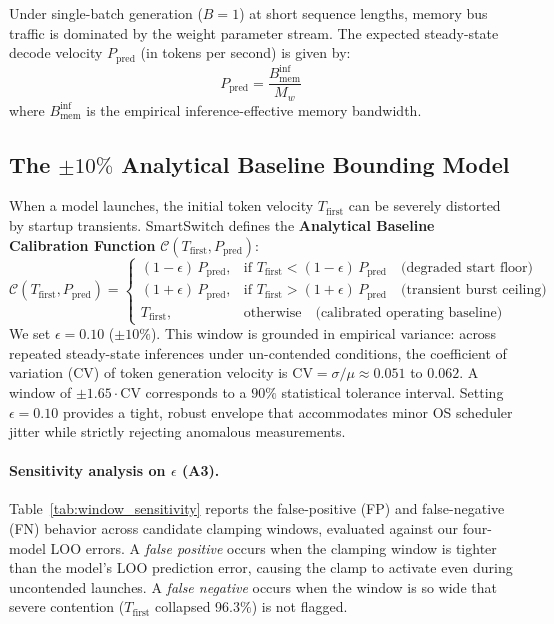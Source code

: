 \documentclass[11pt,a4paper]{article}
\newcommand{\Binf}{B_{\mathrm{mem}}^{\mathrm{inf}}}
\newcommand{\Tfirst}{T_{\mathrm{first}}}
\newcommand{\Ppred}{P_{\mathrm{pred}}}
\newcommand{\Mw}{M_w}
\newcommand{\Cfun}{\mathcal{C}}
\begin{document}
Under single-batch generation ($B=1$) at short sequence lengths, memory bus traffic is dominated by the weight parameter stream. The expected steady-state decode velocity $\Ppred$ (in tokens per second) is given by:
\begin{equation}\label{eq:ppred}
\Ppred = \frac{\Binf}{\Mw}
\end{equation}
where $\Binf$ is the empirical inference-effective memory bandwidth.

\subsection{The $\pm 10\%$ Analytical Baseline Bounding Model}
When a model launches, the initial token velocity $\Tfirst$ can be severely distorted by startup transients. SmartSwitch defines the \textbf{Analytical Baseline Calibration Function} $\Cfun(\Tfirst, \Ppred)$:
\begin{equation}\label{eq:clamp}
\Cfun(\Tfirst,\Ppred)=
\begin{cases}
(1-\epsilon)\,\Ppred, & \text{if } \Tfirst<(1-\epsilon)\,\Ppred \quad\text{(degraded start floor)}\\[2pt]
(1+\epsilon)\,\Ppred, & \text{if } \Tfirst>(1+\epsilon)\,\Ppred \quad\text{(transient burst ceiling)}\\[2pt]
\Tfirst, & \text{otherwise} \quad\text{(calibrated operating baseline)}
\end{cases}
\end{equation}
We set $\epsilon = 0.10$ ($\pm 10\%$). This window is grounded in empirical variance: across repeated steady-state inferences under un-contended conditions, the coefficient of variation (CV) of token generation velocity is $\mathrm{CV} = \sigma/\mu \approx 0.051$ to $0.062$. A window of $\pm 1.65 \cdot \mathrm{CV}$ corresponds to a $90\%$ statistical tolerance interval. Setting $\epsilon = 0.10$ provides a tight, robust envelope that accommodates minor OS scheduler jitter while strictly rejecting anomalous measurements.

\paragraph{Sensitivity analysis on $\epsilon$ (A3).}
Table~\ref{tab:window_sensitivity} reports the false-positive (FP) and false-negative (FN) behavior across candidate clamping windows, evaluated against our four-model LOO errors. A \emph{false positive} occurs when the clamping window is tighter than the model's LOO prediction error, causing the clamp to activate even during uncontended launches. A \emph{false negative} occurs when the window is so wide that severe contention ($\Tfirst$ collapsed 96.3\%) is not flagged.
\end{document}
